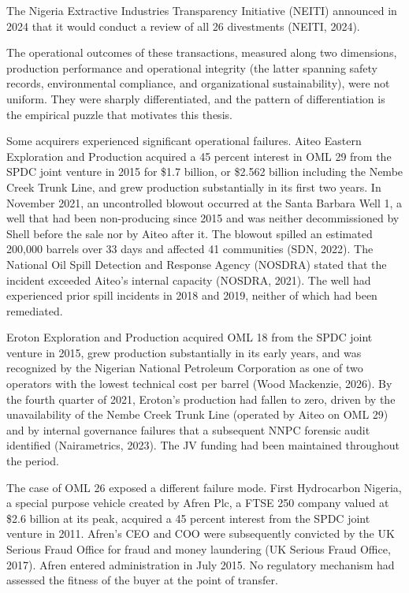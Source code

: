 \documentclass[twoside,fontset=lmodern]{mitthesis}
\begin{document}
The Nigeria Extractive Industries Transparency Initiative (NEITI)
announced in 2024 that it would conduct a review of all 26 divestments
(NEITI, 2024).

The operational outcomes of these transactions, measured along two
dimensions, production performance and operational integrity (the latter
spanning safety records, environmental compliance, and organizational
sustainability), were not uniform. They were sharply differentiated, and
the pattern of differentiation is the empirical puzzle that motivates
this thesis.

Some acquirers experienced significant operational failures. Aiteo
Eastern Exploration and Production acquired a 45 percent interest in OML
29 from the SPDC joint venture in 2015 for \$1.7 billion, or \$2.562
billion including the Nembe Creek Trunk Line, and grew production
substantially in its first two years. In November 2021, an uncontrolled
blowout occurred at the Santa Barbara Well 1, a well that had been
non-producing since 2015 and was neither decommissioned by Shell before
the sale nor by Aiteo after it. The blowout spilled an estimated 200,000
barrels over 33 days and affected 41 communities (SDN, 2022). The
National Oil Spill Detection and Response Agency (NOSDRA) stated that
the incident exceeded Aiteo's internal capacity (NOSDRA, 2021). The well
had experienced prior spill incidents in 2018 and 2019, neither of which
had been remediated.

Eroton Exploration and Production acquired OML 18 from the SPDC joint
venture in 2015, grew production substantially in its early years, and
was recognized by the Nigerian National Petroleum Corporation as one of
two operators with the lowest technical cost per barrel (Wood Mackenzie,
2026). By the fourth quarter of 2021, Eroton's production had fallen to
zero, driven by the unavailability of the Nembe Creek Trunk Line
(operated by Aiteo on OML 29) and by internal governance failures that a
subsequent NNPC forensic audit identified (Nairametrics, 2023). The JV
funding had been maintained throughout the period.

The case of OML 26 exposed a different failure mode. First Hydrocarbon
Nigeria, a special purpose vehicle created by Afren Plc, a FTSE 250
company valued at \$2.6 billion at its peak, acquired a 45 percent
interest from the SPDC joint venture in 2011. Afren's CEO and COO were
subsequently convicted by the UK Serious Fraud Office for fraud and
money laundering (UK Serious Fraud Office, 2017). Afren entered
administration in July 2015. No regulatory mechanism had assessed the
fitness of the buyer at the point of transfer.
\end{document}
